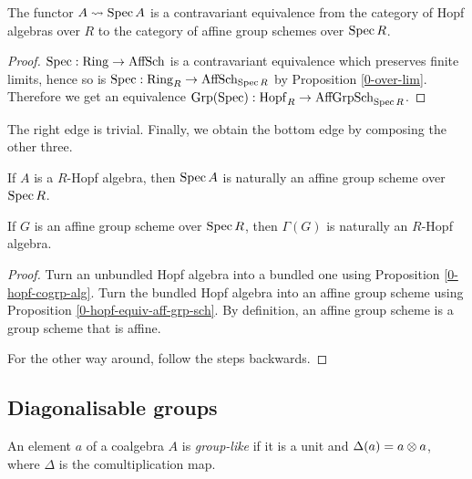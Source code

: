 \begin{proposition}
  \label{0-hopf-equiv-aff-grp-sch}
  \uses{}
  \leanok

  The functor $A\rightsquigarrow \operatorname{Spec} A$ is a contravariant equivalence from the category of Hopf algebras over $R$ to the category of affine group schemes over $\operatorname{Spec} R$.
\end{proposition}
\begin{proof}

  $\operatorname{Spec} : \operatorname{Ring} \to \operatorname{AffSch}$ is a contravariant equivalence which preserves finite limits, hence so is
  $\operatorname{Spec} : \operatorname{Ring}_R \to \operatorname{AffSch}_{\operatorname{Spec} R}$ by Proposition \ref{0-over-lim}. Therefore we get an equivalence $\operatorname{Grp}(\operatorname{Spec}) : \operatorname{Hopf}_R \to \operatorname{AffGrpSch}_{\operatorname{Spec} R}$.
\end{proof}


The right edge is trivial. Finally, we obtain the bottom edge by composing the other three.


\begin{theorem}
  \label{0-hopf-aff-grp-sch}
  \uses{}
  \leanok

  If $A$ is a $R$-Hopf algebra, then $\operatorname{Spec} A$ is naturally an affine group scheme over $\operatorname{Spec} R$.

  If $G$ is an affine group scheme over $\operatorname{Spec} R$, then $\Gamma(G)$ is naturally an $R$-Hopf algebra.
\end{theorem}
\begin{proof}

  Turn an unbundled Hopf algebra into a bundled one using Proposition \ref{0-hopf-cogrp-alg}. Turn
  the bundled Hopf algebra into an affine group scheme using Proposition \ref{0-hopf-equiv-aff-grp-sch}. By definition, an affine group scheme is a group scheme that is affine.

  For the other way around, follow the steps backwards.
\end{proof}


\subsection{Diagonalisable groups}


\begin{definition}
  \label{0-grp-like}
  \uses{}
  \leanok

  An element $a$ of a coalgebra $A$ is \emph{group-like} if it is a unit and $\Delta(a) = a \otimes a$, where $\Delta$ is the comultiplication map.
\end{definition}


